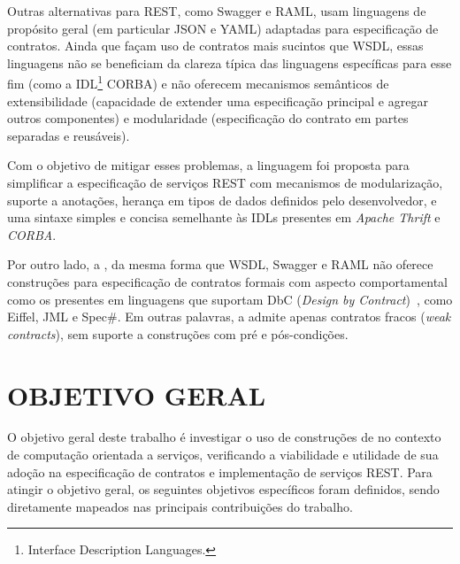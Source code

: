 Outras alternativas para REST, como Swagger\cite{swaggerSite} e
RAML\cite{RAML}, usam linguagens de propósito geral (em
particular JSON\cite{JSon} e YAML\cite{YAML}) adaptadas para especificação de
contratos.
Ainda que façam uso de contratos mais sucintos que WSDL, essas linguagens não se
beneficiam da clareza típica das linguagens específicas para esse fim (como
a IDL\footnote{Interface Description
Languages.} CORBA\cite{corba}) e não oferecem
mecanismos semânticos de extensibilidade (capacidade de extender uma
especificação principal e agregar outros componentes) e modularidade
(especificação do contrato em partes separadas e reusáveis).

Com o objetivo de mitigar esses problemas, a linguagem \neoidl{} foi proposta
para simplificar a especificação de serviços REST com mecanismos de modularização,
suporte a anotações, herança em tipos de dados definidos pelo desenvolvedor, e
uma sintaxe simples e concisa semelhante às IDLs presentes em \emph{Apache
Thrift}\texttrademark\cite{thrift} e \emph{CORBA}\texttrademark\cite{corba}.

Por outro lado, a \neoidl{}, da mesma forma que WSDL,
Swagger e RAML não oferece construções para especificação de contratos formais
com aspecto comportamental como os presentes em linguagens que
suportam DbC (\emph{Design by Contract})~\cite{meyer1992applying}, como
Eiffel\cite{meyer1988eiffel}, JML\cite{leavens2006design} e
Spec\#\cite{barnett2004spec}. Em outras palavras, a \neoidl{} admite apenas contratos fracos (\textit{weak contracts}), sem suporte a construções com pré e
pós-condições.



\section{OBJETIVO GERAL}
\label{ObjGeral}
\vspace{-6mm}

O objetivo geral deste trabalho é investigar o uso de construções de
\designbycontract{} no contexto de computação orientada a serviços, verificando a
viabilidade e utilidade de sua adoção na especificação de contratos e
implementação de serviços REST. Para atingir o objetivo geral, os seguintes 
objetivos específicos foram definidos, sendo diretamente mapeados nas 
principais contribuições do trabalho. 

\vspace{-6mm}

